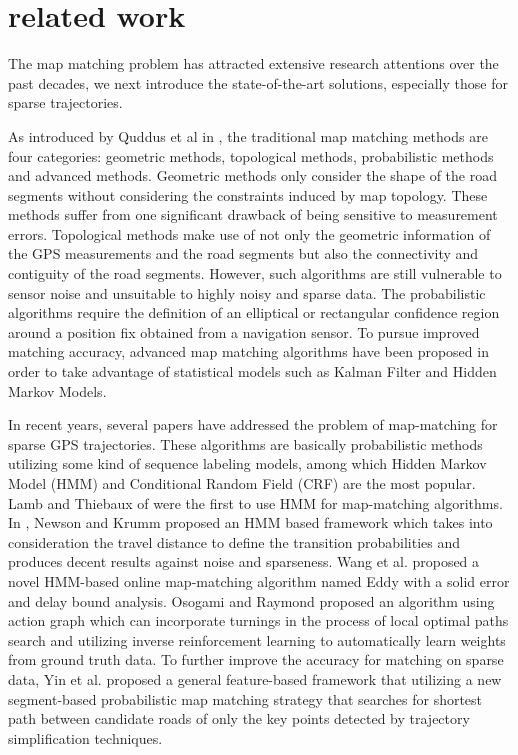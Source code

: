 
\section{related work}
\label{sec-related}

The map matching problem has attracted extensive research attentions over the
past decades, we next introduce the state-of-the-art solutions, especially those for sparse trajectories.


As introduced by Quddus et al in \cite{Quddus2003}, the traditional map matching methods are four categories:
geometric methods, topological methods, probabilistic methods and advanced
methods.
Geometric methods only consider the shape of the road
segments without considering the constraints induced by map topology. These
methods suffer from one significant drawback of being sensitive to measurement
errors.
Topological methods \cite{Greenfeld2002b,White2000b,948625} make use of not only the
geometric information of the GPS measurements and the road segments but also the
connectivity and contiguity of the road segments. However, such algorithms are
still vulnerable to sensor noise and unsuitable to highly noisy and sparse data.
The probabilistic {algorithms \cite{zhao1997,Ochieng2009}} require the definition of an elliptical or rectangular confidence region around a position fix obtained from a navigation sensor.
To pursue improved matching accuracy, advanced map matching algorithms \cite{Newson2009Hidden,Hunter2013,liu:st-crf,Wang:eddy} have been proposed in order to take advantage of statistical models such as Kalman Filter and Hidden Markov Models.


In recent years, several papers have addressed the problem of map-matching for
sparse GPS trajectories. These algorithms are basically probabilistic methods
utilizing some kind of sequence labeling models, among which Hidden Markov Model (HMM)
and Conditional Random Field (CRF) are the most popular.
Lamb and Thiebaux of \cite{Lamb1999Avoiding} were the first to use HMM for map-matching algorithms.
In \cite{Newson2009Hidden}, Newson and Krumm proposed an HMM based framework
which takes into consideration the travel distance to define the transition
probabilities and produces decent results against noise and sparseness.
%
Wang et al. proposed a novel HMM-based online map-matching algorithm named Eddy
\cite{Wang:eddy} with a solid error and delay bound analysis.
%
Osogami and Raymond proposed an algorithm {\cite{Osogami:2013:IRL}} using action graph which can
incorporate turnings in the process of local optimal paths search and utilizing inverse reinforcement
learning to automatically learn weights from ground truth data.
%
To further improve the accuracy for matching on sparse data, Yin et al. proposed
a general feature-based framework \cite{yin:feature-based} that utilizing a new segment-based
probabilistic map matching strategy that searches for shortest path between
candidate roads of only the key points detected by trajectory simplification techniques.

